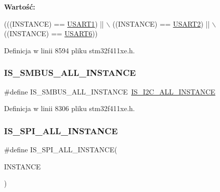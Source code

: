 {\bfseries Wartość\+:}
\begin{DoxyCode}
(((INSTANCE) == \hyperlink{group___peripheral__declaration_ga92871691058ff7ccffd7635930cb08da}{USART1}) || \(\backslash\)
                                         ((INSTANCE) == \hyperlink{group___peripheral__declaration_gaf114a9eab03ca08a6fb720e511595930}{USART2}) || \(\backslash\)
                                         ((INSTANCE) == \hyperlink{group___peripheral__declaration_ga2dab39a19ce3dd05fe360dcbb7b5dc84}{USART6}))
\end{DoxyCode}


Definicja w linii 8594 pliku stm32f411xe.\+h.

\mbox{\label{group___exported__macros_ga85b79d63f4643c0de9a7519290a0eceb}} 
\subsubsection{\texorpdfstring{I\+S\+\_\+\+S\+M\+B\+U\+S\+\_\+\+A\+L\+L\+\_\+\+I\+N\+S\+T\+A\+N\+CE}{IS\_SMBUS\_ALL\_INSTANCE}}
{\footnotesize\ttfamily \#define I\+S\+\_\+\+S\+M\+B\+U\+S\+\_\+\+A\+L\+L\+\_\+\+I\+N\+S\+T\+A\+N\+CE~\hyperlink{group___exported__macros_gacdf0149a4e8c41a6814c13613c38a6b2}{I\+S\+\_\+\+I2\+C\+\_\+\+A\+L\+L\+\_\+\+I\+N\+S\+T\+A\+N\+CE}}



Definicja w linii 8306 pliku stm32f411xe.\+h.

\mbox{\label{group___exported__macros_ga59c7619a86c03df3ebeb4bd8aaef982c}} 
\subsubsection{\texorpdfstring{I\+S\+\_\+\+S\+P\+I\+\_\+\+A\+L\+L\+\_\+\+I\+N\+S\+T\+A\+N\+CE}{IS\_SPI\_ALL\_INSTANCE}}
{\footnotesize\ttfamily \#define I\+S\+\_\+\+S\+P\+I\+\_\+\+A\+L\+L\+\_\+\+I\+N\+S\+T\+A\+N\+CE(\begin{DoxyParamCaption}\item[{}]{I\+N\+S\+T\+A\+N\+CE }\end{DoxyParamCaption})}


